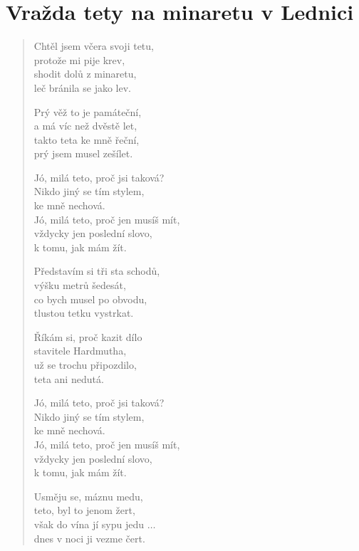\section{Vražda tety na minaretu v Lednici}

\thispagestyle{empty}

\begin{multicols}{2}
\begin{verse}

Chtěl jsem včera svoji tetu,\\
protože mi pije krev,\\
shodit dolů z minaretu,\\
leč bránila se jako lev.

Prý věž to je památeční,\\
a má víc než dvěstě let,\\
takto teta ke mně řeční,\\
prý jsem musel zešílet.

Jó, milá teto, proč jsi taková?\\
Nikdo jiný se tím stylem,\\
ke mně nechová.\\
Jó, milá teto, proč jen musíš mít,\\
vždycky jen poslední slovo,\\
k tomu, jak mám žít.

Představím si tři sta schodů,\\
výšku metrů šedesát,\\
co bych musel po obvodu,\\
tlustou tetku vystrkat.

Říkám si, proč kazit dílo\\
stavitele Hardmutha,\\
už se trochu připozdilo,\\
teta ani nedutá.

\columnbreak

Jó, milá teto, proč jsi taková?\\
Nikdo jiný se tím stylem,\\
ke mně nechová.\\
Jó, milá teto, proč jen musíš mít,\\
vždycky jen poslední slovo,\\
k tomu, jak mám žít.

Usměju se, máznu medu,\\
teto, byl to jenom žert,\\
však do vína jí sypu jedu $\ldots{}$\\
dnes v noci ji vezme čert.
\end{verse}
\end{multicols}
